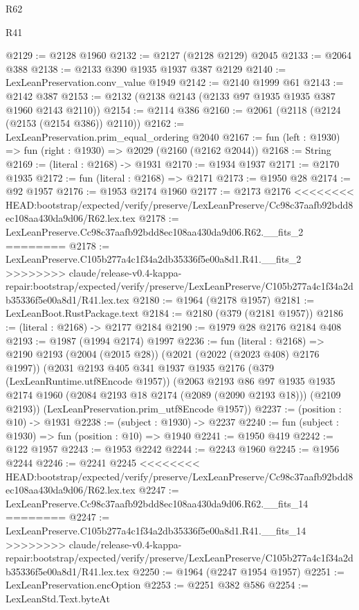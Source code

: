 \begin{lexlean}{R62}
\begin{lexlean}{R41}
\begin{coremodule}
{{{{{{{{{{{{{{{{{{{{{{{{{{{{{{{{{{{{{{{{{{{{{{{{{{{{{{{{{{{{{{{{{{{{{{{{{{{{{{{{{{{{{{{@2129 := @2128 @1960
@2132 := @2127 (@2128 @2129) @2045
@2133 := @2064 @388
@2138 := @2133 @390 @1935 @1937 @387 @2129
@2140 := LexLeanPreservation.conv_value @1949
@2142 := @2140 @1999 @61
@2143 := @2142 @387
@2153 := @2132 (@2138 @2143 (@2133 @97 @1935 @1935 @387 @1960 @2143 @2110))
@2154 := @2114 @386
@2160 := @2061 (@2118 (@2124 (@2153 (@2154 @386)) @2110))
@2162 := LexLeanPreservation.prim_equal_ordering @2040
@2167 := fun (left : @1930) => fun (right : @1930) => @2029 (@2160 (@2162 @2044))
@2168 := String
@2169 := (literal : @2168) -> @1931
@2170 := @1934 @1937
@2171 := @2170 @1935
@2172 := fun (literal : @2168) => @2171
@2173 := @1950 @28
@2174 := @92 @1957
@2176 := @1953 @2174 @1960
@2177 := @2173 @2176
<<<<<<<< HEAD:bootstrap/expected/verify/preserve/LexLeanPreserve/Cc98c37aafb92bdd8ec108aa430da9d06/R62.lex.tex
@2178 := LexLeanPreserve.Cc98c37aafb92bdd8ec108aa430da9d06.R62.__fits_2
========
@2178 := LexLeanPreserve.C105b277a4c1f34a2db35336f5e00a8d1.R41.__fits_2
>>>>>>>> claude/release-v0.4-kappa-repair:bootstrap/expected/verify/preserve/LexLeanPreserve/C105b277a4c1f34a2db35336f5e00a8d1/R41.lex.tex
@2180 := @1964 (@2178 @1957)
@2181 := LexLeanBoot.RustPackage.text
@2184 := @2180 (@379 (@2181 @1957))
@2186 := (literal : @2168) -> @2177 @2184
@2190 := @1979 @28 @2176 @2184 @408
@2193 := @1987 (@1994 @2174) @1997
@2236 := fun (literal : @2168) =>
  @2190
    @2193
    (@2004 (@2015 @28))
    (@2021 (@2022 (@2023 @408) @2176 @1997))
    (@2031
      @2193
      @405
      @341
      @1937
      @1935
      @2176
      (@379 (LexLeanRuntime.utf8Encode @1957))
      (@2063
        @2193
        @86
        @97
        @1935
        @1935
        @2174
        @1960
        (@2084 @2193 @18 @2174 (@2089 (@2090 @2193 @18)))
        (@2109 @2193))
      (LexLeanPreservation.prim_utf8Encode @1957))
@2237 := (position : @10) -> @1931
@2238 := (subject : @1930) -> @2237
@2240 := fun (subject : @1930) => fun (position : @10) => @1940
@2241 := @1950 @419
@2242 := @122 @1957
@2243 := @1953 @2242
@2244 := @2243 @1960
@2245 := @1956 @2244
@2246 := @2241 @2245
<<<<<<<< HEAD:bootstrap/expected/verify/preserve/LexLeanPreserve/Cc98c37aafb92bdd8ec108aa430da9d06/R62.lex.tex
@2247 := LexLeanPreserve.Cc98c37aafb92bdd8ec108aa430da9d06.R62.__fits_14
========
@2247 := LexLeanPreserve.C105b277a4c1f34a2db35336f5e00a8d1.R41.__fits_14
>>>>>>>> claude/release-v0.4-kappa-repair:bootstrap/expected/verify/preserve/LexLeanPreserve/C105b277a4c1f34a2db35336f5e00a8d1/R41.lex.tex
@2250 := @1964 (@2247 @1954 @1957)
@2251 := LexLeanPreservation.encOption
@2253 := @2251 @382 @586
@2254 := LexLeanStd.Text.byteAt
}}}}}}}}}}}}}}}}}}}}}}}}}}}}}}}}}}}}}}}}}}}}}}}}}}}}}}}}}}}}}}}}}}}}}}}}}}}}}}}}}}}}}}}
\end{coremodule}
\end{lexlean}
\end{lexlean}
